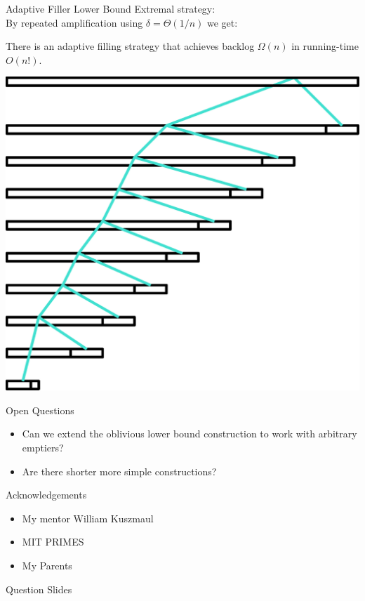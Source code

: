 \documentclass[xcolor=x11names, svgnames, rgb]{beamer}
\begin{document}
\begin{frame}[t]{Adaptive Filler Lower Bound}
  Extremal strategy:\\
  By repeated amplification using $\delta=\Theta(1/n)$ we get: 
  \begin{theorem}
    There is an adaptive filling strategy that achieves backlog $\Omega(n)$ in running-time $O(n!)$.
  \end{theorem}
  \vspace{0.5cm}
  \includegraphics[width=0.45\linewidth]{amplificationImgs/expo_cor.eps}
\end{frame}

\begin{frame}[t]{Open Questions}
  \begin{itemize}
    \item Can we extend the oblivious lower bound construction to work with arbitrary emptiers?
    \item Are there shorter more simple constructions?
  \end{itemize}
\end{frame}

\begin{frame}[t]{Acknowledgements}
  \begin{itemize}
    \item My mentor William Kuszmaul
    \item MIT PRIMES
    \item My Parents
 \end{itemize} 
\end{frame}

\begin{frame}[c]{}
\begin{center}
\Huge Question Slides
\end{center}
\end{frame}
\end{document}
